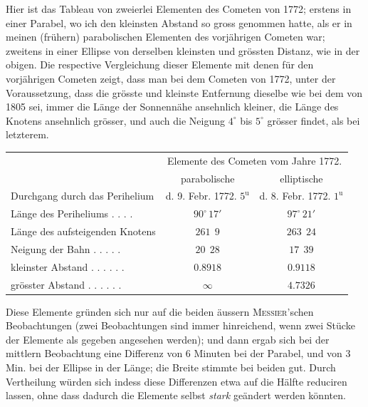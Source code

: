 \par\indent Hier ist das Tableau von zweierlei Elementen des Cometen von 1772; erstens in einer Parabel,
wo ich den kleinsten Abstand so gross genommen hatte, als er in meinen (frühern) parabolischen Elementen
des vorjährigen Cometen war; zweitens in einer Ellipse von derselben kleinsten und grössten
Distanz, wie in der obigen. Die respective Vergleichung dieser Elemente mit denen für den vorjährigen
Cometen zeigt, dass man bei dem Cometen von 1772, unter der Voraussetzung, dass die grösste und
kleinste Entfernung dieselbe wie bei dem von 1805 sei, immer die Länge der Sonnennähe ansehnlich
kleiner, die Länge des Knotens ansehnlich grösser, und auch die Neigung $4^\circ$ bis $5^\circ$ grösser findet, als
bei letzterem.

\begin{center}\begingroup
\fontsize{8}{10}\selectfont
\setlength{\tabcolsep}{2pt}\renewcommand{\arraystretch}{1.12}
\begin{tabular}{l|c|c}
& \multicolumn{2}{c}{Elemente des Cometen vom Jahre 1772.} \\
 & parabolische & elliptische \\
\hline
Durchgang durch das Perihelium & d. 9. Febr. 1772. $5^{\mathrm{u}}$ & d. 8. Febr. 1772. $1^{\mathrm{u}}$ \\
Länge des Periheliums . . . . & $90^{\circ}\,17'$ & $97^{\circ}\,21'$ \\
Länge des aufsteigenden Knotens & $261\ \ 9$ & $263\ \ 24$ \\
Neigung der Bahn . . . . . & $20\ \ 28$ & $17\ \ 39$ \\
kleinster Abstand . . . . . . & $0.8918$ & $0.9118$ \\
grösster Abstand . . . . . . & $\infty$ & $4.7326$ \\
\end{tabular}\endgroup\end{center}

\par\indent Diese Elemente gründen sich nur auf die beiden äussern \textsc{Messier}'schen Beobachtungen (zwei Beobachtungen
sind immer hinreichend, wenn zwei Stücke der Elemente als gegeben angesehen werden);
und dann ergab sich bei der mittlern Beobachtung eine Differenz von 6 Minuten bei der Parabel, und
von 3 Min. bei der Ellipse in der Länge; die Breite stimmte bei beiden gut. Durch Vertheilung würden
sich indess diese Differenzen etwa auf die Hälfte reduciren lassen, ohne dass dadurch die Elemente selbst
\emph{stark} geändert werden könnten.

